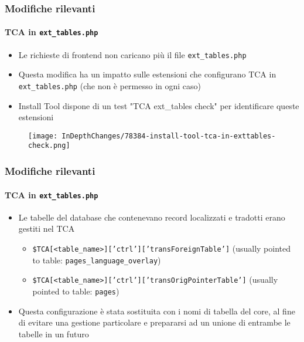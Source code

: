 \begin{frame}[fragile]
	\frametitle{Modifiche rilevanti}
	\framesubtitle{TCA in \texttt{ext\_tables.php}}

	\begin{itemize}
		\item Le richieste di frontend non caricano più il file \texttt{ext\_tables.php}
		\item Questa modifica ha un impatto sulle estensioni che configurano TCA in \texttt{ext\_tables.php}\newline
			\small(che non è permesso in ogni caso)\normalsize
		\item Install Tool dispone di un test "TCA ext\_tables check" per identificare queste estensioni
	\end{itemize}

	\begin{figure}
		\texttt{[image: InDepthChanges/78384-install-tool-tca-in-exttables-check.png]}
	\end{figure}

\end{frame}
\begin{frame}[fragile]
	\frametitle{Modifiche rilevanti}
	\framesubtitle{TCA in \texttt{ext\_tables.php}}

	\begin{itemize}
		\item Le tabelle del database che contenevano record localizzati e tradotti erano gestiti nel TCA

			\begin{itemize}
				\item \texttt{\$TCA[<table\_name>]['ctrl']['transForeignTable']}\newline
					(usually pointed to table: \texttt{pages\_language\_overlay})
				\item \texttt{\$TCA[<table\_name>]['ctrl']['transOrigPointerTable']}\newline
					(usually pointed to table: \texttt{pages})
			\end{itemize}

		\item Questa configurazione è stata sostituita con i nomi di tabella del core, al fine di evitare una	
			gestione particolare e prepararsi ad un unione di entrambe le tabelle in un futuro

	\end{itemize}

\end{frame}

